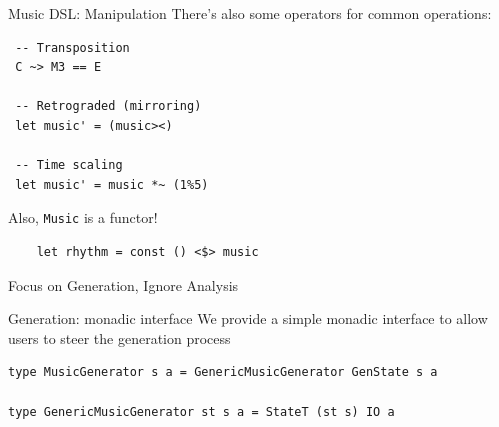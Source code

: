 \documentclass{beamer}
\newcommand{\icode}[1]{\texttt{#1}}
\begin{document}
    \begin{frame}[fragile=singleslide]{Music DSL: Manipulation}
	There's also some operators for common operations:

    \begin{verbatim}
 -- Transposition
 C ~> M3 == E

 -- Retrograded (mirroring)
 let music' = (music><)

 -- Time scaling
 let music' = music *~ (1%5)

    \end{verbatim}

	Also, \icode{Music} is a functor!

	\begin{verbatim}
	let rhythm = const () <$> music
    \end{verbatim}
	\end{frame}

	{
	\begin{frame}{Focus on Generation, Ignore Analysis}
	\end{frame}
	}

  \begin{frame}[fragile=singleslide]{Generation: monadic interface}
	We provide a simple monadic interface to allow users to steer the generation process

    \begin{verbatim}
type MusicGenerator s a = GenericMusicGenerator GenState s a

type GenericMusicGenerator st s a = StateT (st s) IO a
    \end{verbatim}
	\end{frame}
\end{document}
